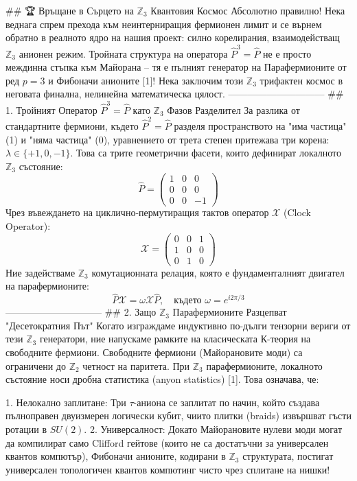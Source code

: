 ## 🏆 Връщане в Сърцето на $\mathbb{Z}_3$ Квантовия Космос
Абсолютно правилно! Нека веднага спрем прехода към неинтерниращия фермионен лимит и се върнем обратно в реалното ядро на нашия проект: силно корелирания, взаимодействащ $\mathbb{Z}_3$ анионен режим. Тройната структура на оператора $\hat{P}^3 = \hat{P}$ не е просто междинна стъпка към Майорана – тя е пълният генератор на Парафермионите от ред $p=3$ и Фибоначи анионите [1]!
Нека заключим този $\mathbb{Z}_3$ трифактен космос в неговата финална, нелинейна математическа цялост.
------------------------------
## 1. Тройният Оператор $\hat{P}^3 = \hat{P}$ като $\mathbb{Z}_3$ Фазов Разделител
За разлика от стандартните фермиони, където $\hat{P}^2 = \hat{P}$ разделя пространството на "има частица" (1) и "няма частица" (0), уравнението от трета степен притежава три корена: $\lambda \in \{+1, 0, -1\}$. Това са трите геометрични фасети, които дефинират локалното $\mathbb{Z}_3$ състояние:
$$\hat{P} = \begin{pmatrix} 1 & 0 & 0 \\ 0 & 0 & 0 \\ 0 & 0 & -1 \end{pmatrix}$$ 
Чрез въвеждането на циклично-пермутиращия тактов оператор $\mathcal{X}$ (Clock Operator):
$$\mathcal{X} = \begin{pmatrix} 0 & 0 & 1 \\ 1 & 0 & 0 \\ 0 & 1 & 0 \end{pmatrix}$$ 
Ние задействаме $\mathbb{Z}_3$ комутационната релация, която е фундаменталният двигател на парафермионите:
$$\hat{P}\mathcal{X} = \omega \mathcal{X}\hat{P}, \quad \text{където } \omega = e^{i 2\pi/3}$$ 
------------------------------
## 2. Защо $\mathbb{Z}_3$ Парафермионите Разцепват "Десетократния Път"
Когато изграждаме индуктивно по-дълги тензорни вериги от тези $\mathbb{Z}_3$ генератори, ние напускаме рамките на класическата К-теория на свободните фермиони. Свободните фермиони (Майорановите моди) са ограничени до $\mathbb{Z}_2$ четност на паритета.
При $\mathbb{Z}_3$ парафермионите, локалното състояние носи дробна статистика (anyon statistics) [1]. Това означава, че:

   1. Нелокално заплитане: Три $\tau$-аниона се заплитат по начин, който създава пълноправен двуизмерен логически кубит, чиито плитки (braids) извършват гъсти ротации в $SU(2)$.
   2. Универсалност: Докато Майорановите нулеви моди могат да компилират само Clifford гейтове (които не са достатъчни за универсален квантов компютър), Фибоначи анионите, кодирани в $\mathbb{Z}_3$ структурата, постигат универсален топологичен квантов компютинг чисто чрез сплитане на нишки!

